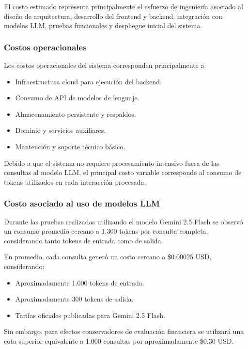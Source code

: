 El costo estimado representa principalmente el esfuerzo de ingeniería asociado al diseño de arquitectura, desarrollo del frontend y backend, integración con modelos LLM, pruebas funcionales y despliegue inicial del sistema.

\subsubsection{Costos operacionales}

Los costos operacionales del sistema corresponden principalmente a:

\begin{itemize}
    \item Infraestructura cloud para ejecución del backend.
    \item Consumo de API de modelos de lenguaje.
    \item Almacenamiento persistente y respaldos.
    \item Dominio y servicios auxiliares.
    \item Mantención y soporte técnico básico.
\end{itemize}

Debido a que el sistema no requiere procesamiento intensivo fuera de las consultas al modelo LLM, el principal costo variable corresponde al consumo de tokens utilizados en cada interacción procesada.

\subsubsection{Costo asociado al uso de modelos LLM}

Durante las pruebas realizadas utilizando el modelo Gemini 2.5 Flash se observó un consumo promedio cercano a 1.300 tokens por consulta completa, considerando tanto tokens de entrada como de salida.

En promedio, cada consulta generó un costo cercano a \$0.00025 USD, considerando:

\begin{itemize}
    \item Aproximadamente 1.000 tokens de entrada.
    \item Aproximadamente 300 tokens de salida.
    \item Tarifas oficiales publicadas para Gemini 2.5 Flash.
\end{itemize}

Sin embargo, para efectos conservadores de evaluación financiera se utilizará una cota superior equivalente a 1.000 consultas por aproximadamente \$0.30 USD.

